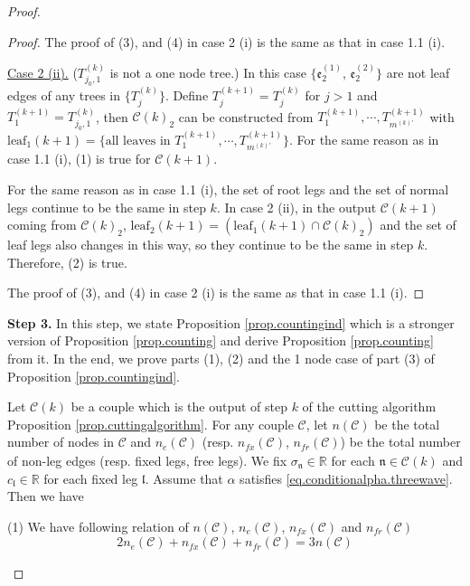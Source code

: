 \begin{proof}
\begin{proof}
The proof of (3), and (4) in case 2 (i) is the same as that in case 1.1 (i).

\underline{Case 2 (ii).} ($T^{(k)}_{j_0,1}$ is not a one node tree.) In this case $\{\mathfrak{e}_{2}^{(1)}$, $\mathfrak{e}_{2}^{(2)}\}$ are not leaf edges of any trees in $\{T_{j}^{(k)}\}$. Define $T^{(k+1)}_{j}=T^{(k)}_{j}$ for $j>1$ and $T^{(k+1)}_{1}=T^{(k)}_{j_0,1}$, then $\mathcal{C}(k)_2$ can be constructed from $T^{(k+1)}_1, \cdots, T^{(k+1)}_{m^{(k)'}}$ with $\text{leaf}_1(k+1)=\{\text{all leaves in }T^{(k+1)}_1, \cdots, T^{(k+1)}_{m^{(k)'}}\}$. For the same reason as in case 1.1 (i), (1) is true for $\mathcal{C}(k+1)$.

For the same reason as in case 1.1 (i), the set of root legs and the set of normal legs continue to be the same in step $k$. In case 2 (ii), in the output $\mathcal{C}(k+1)$ coming from $\mathcal{C}(k)_2$, $\text{leaf}_2(k+1)=(\text{leaf}_1(k+1)\cap \mathcal{C}(k)_2)$ and the set of leaf legs also changes in this way, so they continue to be the same in step $k$. Therefore, (2) is true.

The proof of (3), and (4) in case 2 (i) is the same as that in case 1.1 (i).
\end{proof}



\textbf{Step 3.} In this step, we state Proposition \ref{prop.countingind} which is a stronger version of Proposition \ref{prop.counting} and derive Proposition \ref{prop.counting} from it. In the end, we prove parts (1), (2) and the 1 node case of part (3) of Proposition \ref{prop.countingind}.


\begin{prop}\label{prop.countingind}
Let $\mathcal{C}(k)$ be a couple which is the output of step $k$ of the cutting algorithm Proposition \ref{prop.cuttingalgorithm}. For any couple $\mathcal{C}$, let $n(\mathcal{C})$ be the total number of nodes in $\mathcal{C}$ and $n_e(\mathcal{C})$ (resp. $n_{fx}(\mathcal{C})$, $n_{\textit{fr}}(\mathcal{C})$) be the total number of non-leg edges (resp. fixed legs, free legs). We fix $\sigma_{\mathfrak{n}}\in\mathbb{R}$ for each $\mathfrak{n}\in \mathcal{C}(k)$ and $c_{\mathfrak{l}}\in \mathbb{R}$ for each fixed leg $\mathfrak{l}$. Assume that $\alpha$ satisfies \eqref{eq.conditionalpha.threewave}. Then we have

(1) We have following relation of $n(\mathcal{C})$, $n_e(\mathcal{C})$, $n_{fx}(\mathcal{C})$ and $n_{\textit{fr}}(\mathcal{C})$
\begin{equation}
    2n_e(\mathcal{C})+n_{fx}(\mathcal{C})+n_{\textit{fr}}(\mathcal{C})=3n(\mathcal{C})
\end{equation}


\end{prop}
\end{proof}

